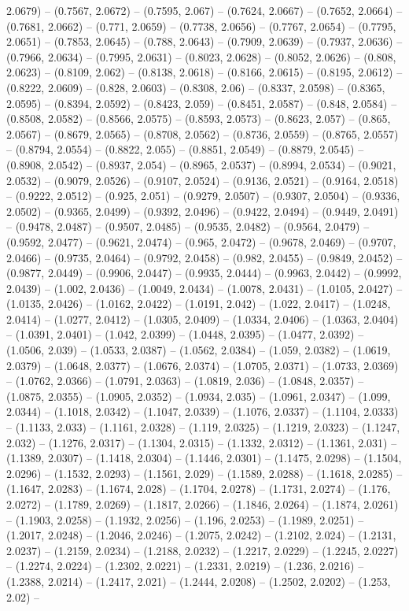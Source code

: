 2.0679) -- (0.7567, 2.0672) -- (0.7595, 2.067) -- (0.7624, 2.0667) -- (0.7652, 2.0664) -- (0.7681, 2.0662) -- (0.771, 2.0659) -- (0.7738, 2.0656) -- (0.7767, 2.0654) -- (0.7795, 2.0651) -- (0.7853, 2.0645) -- (0.788, 2.0643) -- (0.7909, 2.0639) -- (0.7937, 2.0636) -- (0.7966, 2.0634) -- (0.7995, 2.0631) -- (0.8023, 2.0628) -- (0.8052, 2.0626) -- (0.808, 2.0623) -- (0.8109, 2.062) -- (0.8138, 2.0618) -- (0.8166, 2.0615) -- (0.8195, 2.0612) -- (0.8222, 2.0609) -- (0.828, 2.0603) -- (0.8308, 2.06) -- (0.8337, 2.0598) -- (0.8365, 2.0595) -- (0.8394, 2.0592) -- (0.8423, 2.059) -- (0.8451, 2.0587) -- (0.848, 2.0584) -- (0.8508, 2.0582) -- (0.8566, 2.0575) -- (0.8593, 2.0573) -- (0.8623, 2.057) -- (0.865, 2.0567) -- (0.8679, 2.0565) -- (0.8708, 2.0562) -- (0.8736, 2.0559) -- (0.8765, 2.0557) -- (0.8794, 2.0554) -- (0.8822, 2.055) -- (0.8851, 2.0549) -- (0.8879, 2.0545) -- (0.8908, 2.0542) -- (0.8937, 2.054) -- (0.8965, 2.0537) -- (0.8994, 2.0534) -- (0.9021, 2.0532) -- (0.9079, 2.0526) -- (0.9107, 2.0524) -- (0.9136, 2.0521) -- (0.9164, 2.0518) -- (0.9222, 2.0512) -- (0.925, 2.051) -- (0.9279, 2.0507) -- (0.9307, 2.0504) -- (0.9336, 2.0502) -- (0.9365, 2.0499) -- (0.9392, 2.0496) -- (0.9422, 2.0494) -- (0.9449, 2.0491) -- (0.9478, 2.0487) -- (0.9507, 2.0485) -- (0.9535, 2.0482) -- (0.9564, 2.0479) -- (0.9592, 2.0477) -- (0.9621, 2.0474) -- (0.965, 2.0472) -- (0.9678, 2.0469) -- (0.9707, 2.0466) -- (0.9735, 2.0464) -- (0.9792, 2.0458) -- (0.982, 2.0455) -- (0.9849, 2.0452) -- (0.9877, 2.0449) -- (0.9906, 2.0447) -- (0.9935, 2.0444) -- (0.9963, 2.0442) -- (0.9992, 2.0439) -- (1.002, 2.0436) -- (1.0049, 2.0434) -- (1.0078, 2.0431) -- (1.0105, 2.0427) -- (1.0135, 2.0426) -- (1.0162, 2.0422) -- (1.0191, 2.042) -- (1.022, 2.0417) -- (1.0248, 2.0414) -- (1.0277, 2.0412) -- (1.0305, 2.0409) -- (1.0334, 2.0406) -- (1.0363, 2.0404) -- (1.0391, 2.0401) -- (1.042, 2.0399) -- (1.0448, 2.0395) -- (1.0477, 2.0392) -- (1.0506, 2.039) -- (1.0533, 2.0387) -- (1.0562, 2.0384) -- (1.059, 2.0382) -- (1.0619, 2.0379) -- (1.0648, 2.0377) -- (1.0676, 2.0374) -- (1.0705, 2.0371) -- (1.0733, 2.0369) -- (1.0762, 2.0366) -- (1.0791, 2.0363) -- (1.0819, 2.036) -- (1.0848, 2.0357) -- (1.0875, 2.0355) -- (1.0905, 2.0352) -- (1.0934, 2.035) -- (1.0961, 2.0347) -- (1.099, 2.0344) -- (1.1018, 2.0342) -- (1.1047, 2.0339) -- (1.1076, 2.0337) -- (1.1104, 2.0333) -- (1.1133, 2.033) -- (1.1161, 2.0328) -- (1.119, 2.0325) -- (1.1219, 2.0323) -- (1.1247, 2.032) -- (1.1276, 2.0317) -- (1.1304, 2.0315) -- (1.1332, 2.0312) -- (1.1361, 2.031) -- (1.1389, 2.0307) -- (1.1418, 2.0304) -- (1.1446, 2.0301) -- (1.1475, 2.0298) -- (1.1504, 2.0296) -- (1.1532, 2.0293) -- (1.1561, 2.029) -- (1.1589, 2.0288) -- (1.1618, 2.0285) -- (1.1647, 2.0283) -- (1.1674, 2.028) -- (1.1704, 2.0278) -- (1.1731, 2.0274) -- (1.176, 2.0272) -- (1.1789, 2.0269) -- (1.1817, 2.0266) -- (1.1846, 2.0264) -- (1.1874, 2.0261) -- (1.1903, 2.0258) -- (1.1932, 2.0256) -- (1.196, 2.0253) -- (1.1989, 2.0251) -- (1.2017, 2.0248) -- (1.2046, 2.0246) -- (1.2075, 2.0242) -- (1.2102, 2.024) -- (1.2131, 2.0237) -- (1.2159, 2.0234) -- (1.2188, 2.0232) -- (1.2217, 2.0229) -- (1.2245, 2.0227) -- (1.2274, 2.0224) -- (1.2302, 2.0221) -- (1.2331, 2.0219) -- (1.236, 2.0216) -- (1.2388, 2.0214) -- (1.2417, 2.021) -- (1.2444, 2.0208) -- (1.2502, 2.0202) -- (1.253, 2.02) -- 